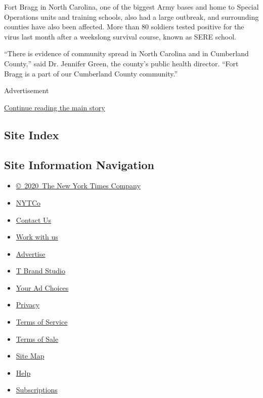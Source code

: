 Fort Bragg in North Carolina, one of the biggest Army bases and home to
Special Operations units and training schools, also had a large
outbreak, and surrounding counties have also been affected. More than 80
soldiers tested positive for the virus last month after a weekslong
survival course, known as SERE school.

``There is evidence of community spread in North Carolina and in
Cumberland County,'' said Dr. Jennifer Green, the county's public health
director. ``Fort Bragg is a part of our Cumberland County community.''

Advertisement

\protect\hyperlink{after-bottom}{Continue reading the main story}

\hypertarget{site-index}{%
\subsection{Site Index}\label{site-index}}

\hypertarget{site-information-navigation}{%
\subsection{Site Information
Navigation}\label{site-information-navigation}}

\begin{itemize}
\tightlist
\item
  \href{https://help.nytimes.com/hc/en-us/articles/115014792127-Copyright-notice}{©~2020~The
  New York Times Company}
\end{itemize}

\begin{itemize}
\tightlist
\item
  \href{https://www.nytco.com/}{NYTCo}
\item
  \href{https://help.nytimes.com/hc/en-us/articles/115015385887-Contact-Us}{Contact
  Us}
\item
  \href{https://www.nytco.com/careers/}{Work with us}
\item
  \href{https://nytmediakit.com/}{Advertise}
\item
  \href{http://www.tbrandstudio.com/}{T Brand Studio}
\item
  \href{https://www.nytimes.com/privacy/cookie-policy\#how-do-i-manage-trackers}{Your
  Ad Choices}
\item
  \href{https://www.nytimes.com/privacy}{Privacy}
\item
  \href{https://help.nytimes.com/hc/en-us/articles/115014893428-Terms-of-service}{Terms
  of Service}
\item
  \href{https://help.nytimes.com/hc/en-us/articles/115014893968-Terms-of-sale}{Terms
  of Sale}
\item
  \href{https://spiderbites.nytimes.com}{Site Map}
\item
  \href{https://help.nytimes.com/hc/en-us}{Help}
\item
  \href{https://www.nytimes.com/subscription?campaignId=37WXW}{Subscriptions}
\end{itemize}
